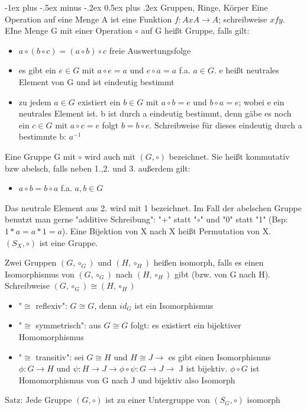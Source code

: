 \documentclass[10pt,landscape]{article}
\makeatletter
\renewcommand{\section}{\@startsection{section}{1}{0mm}%
                                {-1ex plus -.5ex minus -.2ex}%
                                {0.5ex plus .2ex}%
                                {\normalfont\large\bfseries}}
\makeatother
\begin{document}
\begin{multicols}{3}
\section{Gruppen, Ringe, Körper}
Eine Operation auf eine Menge A ist eine Funktion $f:AxA\rightarrow A$; schreibweise $xfy$. EIne Menge G mit einer Operation $\circ$ auf G heißt Gruppe, falls gilt:
\begin{itemize}
    \item $a\circ (b\circ c) = (a\circ b)\circ c$ freie Auswertungsfolge
    \item es gibt ein $e\in G$ mit $a\circ e=a$ und $e\circ a=a$ f.a. $a\in G$. e heißt neutrales Element von G und ist eindeutig bestimmt
    \item zu jedem $a\in G$ existiert ein $b\in G$ mit $a\circ b=e$ und $b\circ a=e$; wobei e ein neutrales Element ist. b ist durch a eindeutig bestimmt, denn gäbe es noch ein $c\in G$ mit $a\circ c=e$ folgt $b=b\circ e$. Schreibweise für dieses eindeutig durch a bestimmte b: $a^{-1}$
\end{itemize}

Eine Gruppe G mit $\circ$ wird auch mit $(G, \circ)$ bezeichnet. Sie heißt kommutativ bzw abelsch, falls neben 1.,2. und 3. außerdem gilt:
\begin{itemize}
    \item $a\circ b = b\circ a$ f.a. $a,b \in G$
\end{itemize}

Das neutrale Element aus 2. wird mit 1 bezeichnet. Im Fall der abelschen Gruppe benutzt man gerne "additive Schreibung": "+" statt "$\circ$" und "0" statt "1" (Bsp: $1*a = a*1 = a$).
Eine Bijektion von X nach X heißt Permutation von X. $(S_X, \circ)$ ist eine Gruppe.

Zwei Gruppen $(G, \circ_G)$ und $(H,\circ_H)$ heißen isomorph, falls es einen Isomorphismus von $(G,\circ_G)$ nach $(H,\circ_H)$ gibt (bzw. von G nach H). Schreibweise $(G,\circ_G)\cong (H,\circ_H)$
\begin{itemize}
    \item "$\cong$ reflexiv": $G\cong G$, denn $id_G$ ist ein Isomorphismus
    \item "$\cong$ symmetrisch": aus $G\cong G$ folgt: es existiert ein bijektiver Homomorphismus
    \item "$\cong$ transitiv": sei $G\cong H$ und $H\cong J \rightarrow$ es gibt einen Isomorphismus $\phi:G\rightarrow H$ und $\psi:H\rightarrow J \rightarrow \phi\circ \psi :G\rightarrow J \rightarrow$ J ist bijektiv. $\phi\circ G$ ist Homomorphismus von G nach J und bijektiv also Isomorph
\end{itemize}
Satz: Jede Gruppe $(G,\circ)$ ist zu einer Untergruppe von $(S_G, \circ)$ isomorph


\end{multicols}
\end{document}

